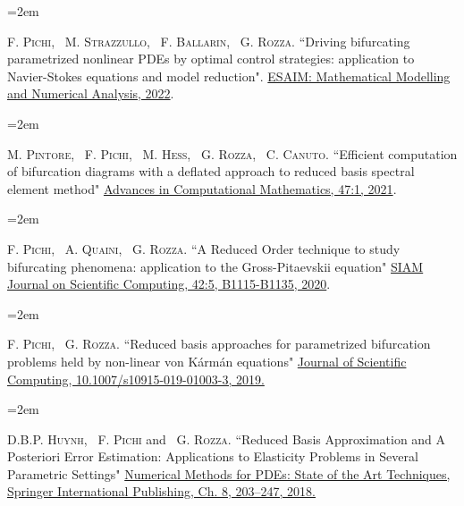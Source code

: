 \documentclass{scrartcl}
\newcommand{\MarginText}[1]{\marginpar{\raggedleft\itshape\small#1}} %
\newlength{\datebox}\settowidth{\datebox}{Spring 2011} %
\newcommand{\NewEntry}[3]{\noindent\hangindent=2em\hangafter=0 \parbox{\datebox}{\small \textit{#1}}\hspace{1.5em} #2 #3 %
\vspace{0.5em}} %
\newcommand{\Description}[1]{\hangindent=2em\hangafter=0\noindent\raggedright\footnotesize{#1}\par\normalsize\vspace{1em}} %
\begin{document}
\begin{cv}{}
\Description{\MarginText{[5]}F. \textsc{Pichi}, ~M. \textsc{Strazzullo}, ~F. \textsc{Ballarin}, ~G. \textsc{Rozza.} {\color{blue} ``Driving bifurcating parametrized nonlinear PDEs by optimal control strategies: application to Navier-Stokes equations and model reduction".} \href{https://www.esaim-m2an.org/articles/m2an/abs/2022/04/m2an200206/m2an200206.html}{ESAIM: Mathematical Modelling and Numerical Analysis, 2022}.}





\Description{\MarginText{[4]}M. \textsc{Pintore}, ~F. \textsc{Pichi}, ~M. \textsc{Hess}, ~G. \textsc{Rozza}, ~C. \textsc{Canuto.} {\color{blue} ``Efficient computation of bifurcation diagrams with a deflated approach to reduced basis spectral element method"} \href{https://link.springer.com/article/10.1007/s10444-020-09827-6}{Advances in Computational Mathematics, 47:1, 2021}.}


\Description{\MarginText{[3]}F. \textsc{Pichi}, ~A. \textsc{Quaini}, ~G. \textsc{Rozza.} {\color{blue} ``A Reduced Order technique to study bifurcating phenomena: application to the Gross-Pitaevskii equation"} \href{https://epubs.siam.org/doi/abs/10.1137/20M1313106}{SIAM Journal on Scientific Computing, 42:5, B1115-B1135, 2020}.}


\Description{\MarginText{[2]}F. \textsc{Pichi}, ~G. \textsc{Rozza.} {\color{blue} ``Reduced basis approaches for parametrized bifurcation problems held by non-linear von K\' arm\' an equations"} \href{http://link.springer.com/article/10.1007/s10915-019-01003-3}{Journal of Scientific Computing, 10.1007/s10915-019-01003-3, 2019.}}



\Description{\MarginText{[1]}D.B.P. \textsc{Huynh}, ~F. \textsc{Pichi} and ~G. \textsc{Rozza.} {\color{blue} ``Reduced Basis Approximation and A Posteriori Error Estimation: Applications to Elasticity Problems in Several Parametric Settings"} \href{https://link.springer.com/chapter/10.1007\%2F978-3-319-94676-4_8}{Numerical Methods for PDEs: State of the Art Techniques, Springer International Publishing, Ch. 8, 203--247, 2018.}}


\end{cv}
\end{document}
